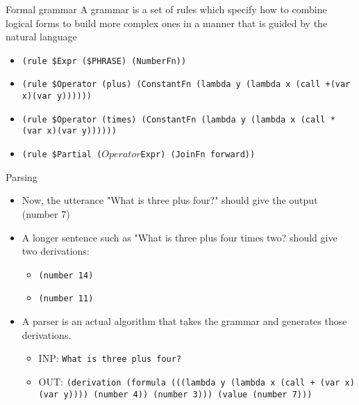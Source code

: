 \documentclass{beamer}
\begin{document}
\begin{frame}{Formal grammar}
A grammar is a set of rules which specify how to combine logical
forms to build more complex ones in a manner that is guided by the
natural language

\begin{example}
    \begin{itemize}
        \item \texttt{(rule \$Expr (\$PHRASE) (NumberFn))}
        \item \texttt{(rule \$Operator (plus) (ConstantFn (lambda y (lambda x (call +(var x)(var y))))))}
        \item \texttt{(rule \$Operator (times) (ConstantFn (lambda y (lambda x (call * (var x)(var y))))))}
        \item \texttt{(rule \$Partial ($Operator $Expr) (JoinFn forward))}
    \end{itemize}
\end{example}
\end{frame}

\begin{frame}{Parsing }
    \begin{itemize}
        \item Now, the utterance "What is three plus four?" should give the output (number 7)
        \item A longer sentence such as "What is three plus four times
two? should give two derivations:
        \begin{itemize}
            \item \texttt{(number 14)}
            \item \texttt{(number 11)}
        \end{itemize}
        \item A parser is an actual algorithm that takes the grammar and generates those derivations.
        \begin{itemize}
            \item INP: \texttt{What is three plus four?}
            \item OUT: \texttt{(derivation (formula (((lambda y (lambda x (call +
(var x) (var y)))) (number 4)) (number 3))) (value
(number 7)))}
        \end{itemize}
    \end{itemize}
\end{frame}
\end{document}
